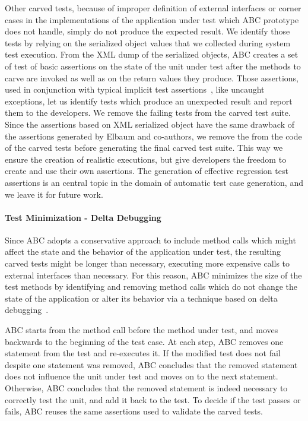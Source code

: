 \documentclass[10pt,conference]{IEEEtran}
\newcommand{\abc}{\textsf{ABC}\xspace}
\begin{document}
Other carved tests, because of improper definition of external interfaces or corner cases in the implementations of the application under test which \abc prototype does not handle, simply do not produce the expected result. 
We identify those tests by relying on the serialized object values that we collected during system test execution. From the XML dump of the serialized objects, \abc creates a set of test of basic assertions on the state of the unit under test after the methods to carve are invoked as well as on the return values they produce.
Those assertions, used in conjunction with typical implicit test assertions~\cite{randoop}, like uncaught exceptions, let us identify
 tests which produce an unexpected result and report them to the developers. We remove the failing tests from the carved test suite.
Since the assertions based on XML serialized object have the same drawback of the assertions generated by Elbaum and co-authors,
we remove the from the code of the carved tests before generating the final carved test suite. This way we ensure the creation of realistic executions, but give developers the freedom to create and use their own assertions. The generation of effective regression test assertions is an central topic in the domain of automatic test case generation, and we leave it for future work.

\paragraph{Test Minimization - Delta Debugging}
Since \abc adopts a conservative approach to include method calls which might affect the state and the behavior of the application under test, the resulting carved tests might be longer than necessary, executing more expensive calls to external interfaces than necessary. 
For this reason, \abc minimizes the size of the test methods by identifying and removing method calls which do not change the state of the application or alter its behavior via a technique based on delta debugging~\cite{delta-debugging}. 

\abc starts from the method call before the method under test, and moves backwards to the beginning of the test case.
At each step, \abc removes one statement from the test and re-executes it. If the modified test does not fail despite one statement was removed, \abc concludes that the removed statement does not influence the unit under test and moves on to the next statement. 
Otherwise, \abc concludes that the removed statement is indeed necessary to correctly test the unit, and add it back to the test. 
To decide if the test passes or fails, \abc reuses the same assertions used to validate the carved tests.
\end{document}
